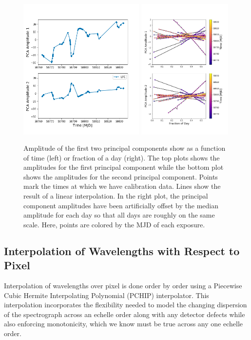 \documentclass[twocolumn]{aastex63}
\begin{document}
\begin{figure}[h!]
\centering
\includegraphics[width=0.56\textwidth]{Figures/pcA_lfc.png}
\includegraphics[width=0.42\textwidth]{Figures/pcAs_byDay.png}
\caption{Amplitude of the first two principal components show as a function of time (left) or fraction of a day (right).  The top plots shows the amplitudes for the first principal component while the bottom plot shows the amplitudes for the second principal component.  Points mark the times at which we have calibration data.  Lines show the result of a linear interpolation.  In the right plot, the principal component amplitudes have been artificially offset by the median amplitude for each day so that all days are roughly on the same scale.  Here, points are colored by the MJD of each exposure.}
\label{fig:nightlyVariation}
\end{figure} 

\subsection{Interpolation of Wavelengths with Respect to Pixel}
Interpolation of wavelengths over pixel  is done order by order using a Piecewise Cubic Hermite Interpolating Polynomial (PCHIP) interpolator.  This interpolation incorporates the flexibility needed to model the changing dispersion of the spectrograph across an echelle order along with any detector defects while also enforcing monotonicity, which we know must be true across any one echelle order.
\end{document}
